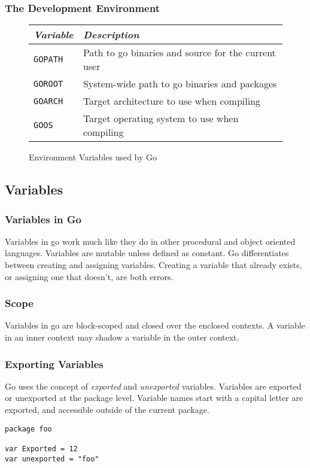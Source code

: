 \documentclass{beamer}
\begin{document}
\begin{frame}[fragile]
  \frametitle{The Development Environment}
  \begin{figure}
  \begin{tabular}{|l|p{3in}|}
    \hline
    \emph{Variable} & \emph{Description} \\
    \hline
    {\tt GOPATH} & \small{Path to go binaries and source for the current user} \\
    \hline
    {\tt GOROOT} & \small{System-wide path to go binaries and packages} \\
    \hline
    {\tt GOARCH} & \small{Target architecture to use when compiling} \\
    \hline
    {\tt GOOS} & \small{Target operating system to use when compiling}\\
    \hline
  \end{tabular}
  \caption{Environment Variables used by Go}
  \end{figure}
\end{frame}

\subsection{Variables}

\begin{frame}
  \frametitle{Variables in Go}
  Variables in go work much like they do in other procedural and
  object oriented languages.  Variables are mutable unless defined as
  constant.  Go differentiates between creating and assigning
  variables.  Creating a variable that already exists, or assigning
  one that doesn't, are both errors.
\end{frame}

\begin{frame}
  \frametitle{Scope}
  Variables in go are block-scoped and closed over the enclosed
  contexts.  A variable in an inner context may shadow a variable in
  the outer context.
\end{frame}

\begin{frame}[fragile]
  \frametitle{Exporting Variables}
  Go uses the concept of \emph{exported} and \emph{unexported}
  variables.  Variables are exported or unexported at the package
  level.  Variable names start with a capital letter are exported, and
  accessible outside of the current package.

\begin{lstlisting}[language=Golang]
package foo

var Exported = 12
var unexported = "foo"
\end{lstlisting}
\end{frame}
\end{document}

